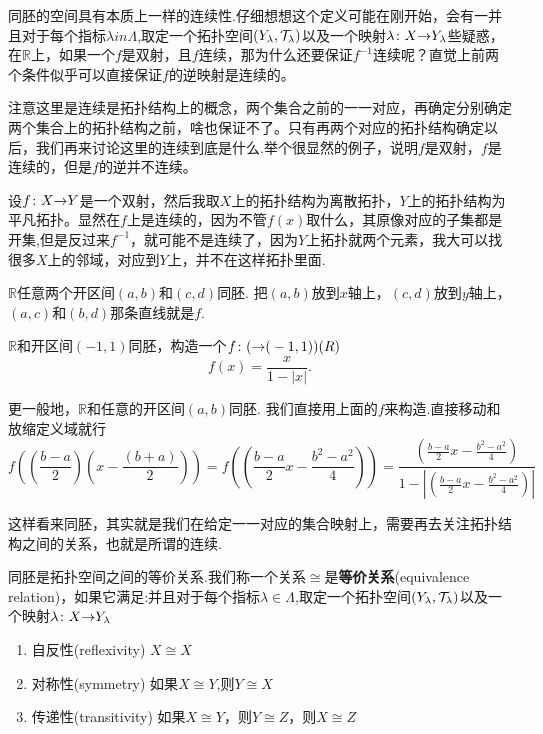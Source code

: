 同胚的空间具有本质上一样的连续性.仔细想想这个定义可能在刚开始，会有一并且对于每个指标$\lambda in \Lambda$,取定一个拓扑空间$(Y_\lambda,\mathcal{T}_\lambda)$以及一个映射${\lambda}\colon{X}{\to}{Y_\lambda}$些疑惑，在$\mathbb{R}$上，如果一个$f$是双射，且$f$连续，那为什么还要保证$f^{-1}$连续呢？直觉上前两个条件似乎可以直接保证$f$的逆映射是连续的。

注意这里是连续是拓扑结构上的概念，两个集合之前的一一对应，再确定分别确定两个集合上的拓扑结构之前，啥也保证不了。只有再两个对应的拓扑结构确定以后，我们再来讨论这里的连续到底是什么.举个很显然的例子，说明$f$是双射，$f$是连续的，但是$f$的逆并不连续。

\begin{example}
设${f}\colon{X}{\to}{Y}$是一个双射，然后我取$X$上的拓扑结构为离散拓扑，$Y$上的拓扑结构为平凡拓扑。显然在$f$上是连续的，因为不管$f(x)$取什么，其原像对应的子集都是开集,但是反过来$f^{-1}$，就可能不是连续了，因为$Y$上拓扑就两个元素，我大可以找很多$X$上的邻域，对应到$Y$上，并不在这样拓扑里面.
\end{example}

\begin{example}
$\mathbb{R}$任意两个开区间$(a,b)$和$(c,d)$同胚. 把$(a,b)$放到$x$轴上，$(c,d)$放到$y$轴上，$(a,c)$和$(b,d)$那条直线就是$f$. 
\end{example}

\begin{example}
$\mathbb{R}$和开区间$(-1,1)$同胚，构造一个${f}\colon{(}{\to}{(}-1,1))(R)$\[f(x)=\frac{x}{1-|x|}.\]
\end{example}

\begin{example}
更一般地，$\mathbb{R}$和任意的开区间$(a,b)$同胚. 我们直接用上面的$f$来构造.直接移动和放缩定义域就行\[f((\frac{b-a}{2})(x-\frac{(b+a)}{2}))=f((\frac{b-a}{2}x-\frac{b^2-a^2}{4}))=\frac{(\frac{b-a}{2}x-\frac{b^2-a^2}{4})}{1-|(\frac{b-a}{2}x-\frac{b^2-a^2}{4})|}\]
\end{example}

这样看来同胚，其实就是我们在给定一一对应的集合映射上，需要再去关注拓扑结构之间的关系，也就是所谓的连续.

\begin{theorem}
同胚是拓扑空间之间的等价关系.我们称一个关系$\cong$是\textbf{等价关系}(equivalence relation)，如果它满足:并且对于每个指标$\lambda \in \Lambda$,取定一个拓扑空间$(Y_\lambda,\mathcal{T}_\lambda)$以及一个映射${\lambda}\colon{X}{\to}{Y_\lambda}$
\begin{enumerate}
	\item 自反性(reflexivity) $X \cong X$
	\item 对称性(symmetry) 如果$X \cong Y$,则$Y \cong X$ 
	\item 传递性(transitivity) 如果$X \cong Y$，则$Y \cong Z$，则$X \cong Z$
\end{enumerate}
\end{theorem}

